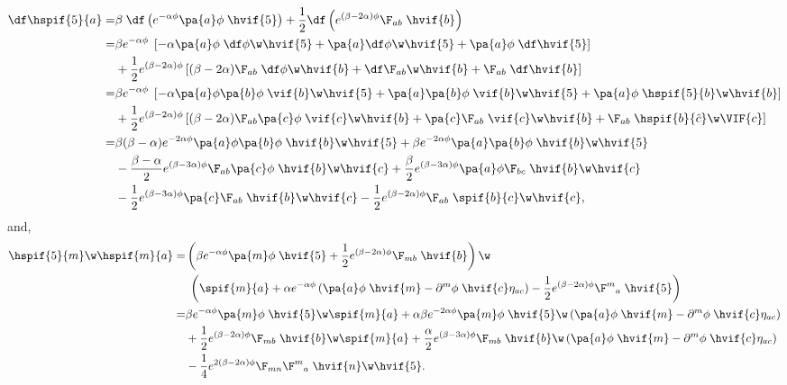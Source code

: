 \begin{align}
  \df\hspif{5}{a} 
  =& \beta\;\df\left( e^{-\alpha\phi}\pa{a}\phi\;\hvif{5}\right) + \frac{1}{2}\df\left(e^{(\beta-2\alpha)\phi}\F_{ab}\;\hvif{b}\right)\nonumber\\
  =& \beta e^{-\alpha\phi}\;\left[-\alpha \pa{a}\phi\;\df\phi\w\hvif{5} +\pa{a}\df\phi\w\hvif{5} + \pa{a}\phi\;\df\hvif{5}\right]\notag\\
  & + \frac{1}{2}e^{(\beta-2\alpha)\phi}\left[(\beta-2\alpha)\F_{ab}\;\df\phi\w\hvif{b} + \df \F_{ab}\w\hvif{b} + \F_{ab}\;\df\hvif{b}\right]\nonumber\\
  =& \beta e^{-\alpha\phi}\;\left[-\alpha \pa{a}\phi\pa{b}\phi\;\vif{b}\w\hvif{5} +\pa{a}\pa{b}\phi\;\vif{b}\w\hvif{5} + \pa{a}\phi\;\hspif{5}{b}\w\hvif{b}\right] \notag\\
  &+ \frac{1}{2}e^{(\beta-2\alpha)\phi}\left[(\beta-2\alpha)\F_{ab}\pa{c}\phi\;\vif{c}\w\hvif{b} + \pa{c} \F_{ab}\;\vif{c}\w\hvif{b} + \F_{ab}\;\hspif{b}{\hat{c}}\w\VIF{c}\right]\nonumber\\
 =& \beta(\beta-\alpha)e^{-2\alpha\phi}\pa{a}\phi\pa{b}\phi\;\hvif{b}\w\hvif{5} + \beta e^{-2\alpha\phi}\pa{a}\pa{b}\phi\;\hvif{b}\w\hvif{5}  \notag\\
 &-\frac{\beta-\alpha}{2}e^{(\beta-3\alpha)\phi}\F_{ab}\pa{c}\phi\;\hvif{b}\w\hvif{c} +\frac{\beta}{2}e^{(\beta-3\alpha)\phi}\pa{a}\phi \F_{bc}\;\hvif{b}\w\hvif{c}\nonumber\\
 & -\frac{1}{2}e^{(\beta-3\alpha)\phi}\pa{c} \F_{ab}\;\hvif{b}\w\hvif{c} - \frac{1}{2}e^{(\beta-2\alpha)\phi}\F_{ab}\; \spif{b}{c}\w\hvif{c},
\end{align}
and,
\begin{align}
  \hspif{5}{m}\w\hspif{m}{a} =& \left(\beta e^{-\alpha\phi}\pa{m}\phi\;\hvif{5} + \frac{1}{2}e^{(\beta-2\alpha)\phi}\F_{m b}\;\hvif{b}  \right)\w\notag\\
  &{}\;\left(\spif{m}{a} + \alpha e^{-\alpha\phi}\left(\pa{a}\phi\;\hvif{m} - \partial^{m}\phi\;\hvif{c}\eta_{a c}\right) - \frac{1}{2}e^{(\beta-2\alpha)\phi}\F^m{}_{ a}\;\hvif{5}  \right)\nonumber\\
 =& \beta e^{-\alpha\phi}\pa{m}\phi\;\hvif{5}\w\spif{m}{a} + \alpha\beta e^{-2\alpha\phi}\pa{m}\phi\;\hvif{5}\w\left(\pa{a}\phi\;\hvif{m} - \partial^{m}\phi\;\hvif{c}\eta_{a c}\right)\nonumber\\
 & + \frac{1}{2}e^{(\beta-2\alpha)\phi}\F_{m b}\;\hvif{b}\w\spif{m}{a} + \frac{\alpha}{2}e^{(\beta-3\alpha)\phi}\F_{m b}\;\hvif{b}\w\left(\pa{a}\phi\;\hvif{m} - \partial^{m}\phi\;\hvif{c}\eta_{a c}\right)\nonumber\\
 & -\frac{1}{4}e^{2(\beta-2\alpha)\phi}\F_{m n}\F^m{}_a\;\hvif{n}\w\hvif{5}.
\end{align}
